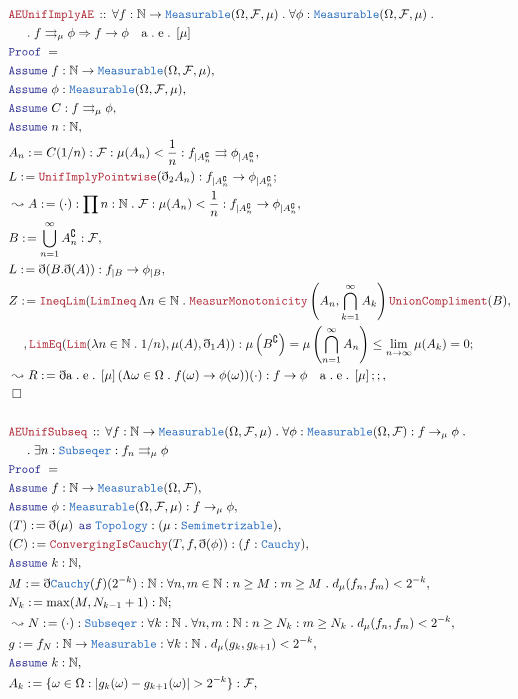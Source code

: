 \documentclass[12pt]{scrartcl}
\newcommand{\TYPE}[1]{\textcolor{NavyBlue}{\mathtt{#1}}}
\newcommand{\LOGIC}[1]{\textcolor{Blue}{\mathtt{#1}}}
\newcommand{\THM}[1]{\textcolor{Maroon}{\mathtt{#1}}}
\renewcommand{\.}{\; . \;}
\newcommand{\de}{: \kern 0.1pc =}
\newcommand{\Act}[1]{\left( #1 \right)}
\newcommand{\Theorem}[2]{& \THM{#1} \, :: \, #2 \\ & \Proof = \\ }
\newcommand{\NewLine}{\\ & \kern 1pc}
\newcommand{\ForEach}[3]{\forall #1 : #2 \. #3 }
\newcommand{\Exist}[2]{\exists #1 : #2}
\newcommand{\DFunc}[3]{\prod #1 : #2 \. #3 }
\newcommand{\Nat}{\mathbb{N} }
\newcommand{\Say}[3]{& #1 \de #2 : #3, \\}
\newcommand{\Conclude}[3]{& #1 \de #2 : #3; \\}
\newcommand{\Derive}[3]{& \leadsto #1 \de #2 : #3, \\}
\newcommand{\A}{\LOGIC{Assume} \;}
\newcommand{\Assume}[2]{& \A #1 : #2, \\}
\newcommand{\As}{\; \LOGIC{as } \;}
\newcommand{\QED}{\; \square}
\newcommand{\EndProof}{& \QED \\}
\newcommand{\ByDef}{\eth}
\newcommand{\Proof}{\LOGIC{Proof} \; }
\newcommand{\UC}{\rightrightarrows}
\renewcommand{\AE}[1]{\mathrm{a\. e\.} \left[#1\right]}
\newcommand{\F}{\mathcal{F}}
\renewcommand{\O}{\Omega}
\begin{document}
\newpage
\begin{align*}
\Theorem{AEUnifImplyAE}{
\ForEach{f}{\Nat \to \TYPE{Measurable}(\O,\F,\mu)}{
\ForEach{\phi}{\TYPE{Measurable}(\O,\F,\mu)}{
 \NewLine \. 
 f \UC_\mu \phi \Rightarrow f \to \phi \quad \AE \mu 
}}}
\Assume{f}{\Nat \to \TYPE{Measurable}(\O,\F,\mu)}
\Assume{\phi}{\TYPE{Measurable}(\O,\F,\mu)}
\Assume{C}{f \UC_\mu \phi}
\Assume{n}{\Nat}
\Say{A_n}{C(1/n)}{\F : \mu(A_n) < \frac{1}{n} : f_{|A_n^\complement} \UC \phi_{|A_n^\complement} }
\Conclude{L}{ \THM{UnifImplyPointwise}(\ByDef_2 A_n)}{f_{|A_n^\complement} \to\phi_{|A_n^\complement}}
\Derive{A}{(\cdot)}{ 
\DFunc{n}{\Nat}{\F : \mu(A_n) < \frac{1}{n} : f_{|A_n^\complement} \to\phi_{|A_n^\complement}}}
\Say{B}{\bigcup_{n=1}^\infty A_n^\complement}{\F}
\Say{L}{\ByDef(B.\ByDef(A))}{f_{|B} \to \phi_{|B}}
\Conclude{Z}{\THM{IneqLim}(\THM{LimIneq} \,  \Lambda n \in \Nat \.\THM{MeasurMonotonicity}\Act{A_n,\bigcap^\infty_{k=1}A_k}\THM{UnionCompliment}(B),
 \NewLine , 
 \THM{LimEq}(\THM{Lim}(\lambda n \in \Nat \. 1/n),\mu(A),\ByDef_1A))}
{\mu \Act{ B^\complement}
 = \mu \Act{\bigcap^\infty_{n=1} A_n } \le \lim_{n \to \infty} \mu(A_k) = 0}
\Derive{R}{\ByDef \AE{\mu}(\Lambda \omega \in \O \. f(\omega) \to \phi(\omega))(\cdot) }
{f \to \phi \quad \AE \mu ;;}
\EndProof
\\
\Theorem{AEUnifSubseq}{
\ForEach{f}{\Nat \to \TYPE{Measurable}(\O,\F,\mu)}{
\ForEach{\phi}{\TYPE{Measurable}(\O,\F) : f \to_\mu \phi}{ 
\NewLine \.
\Exist{n}{\TYPE{Subseqer} : f_n \UC_\mu \phi}
}}}
\Assume{f}{  \Nat \to \TYPE{Measurable}(\O,\F) }
\Assume{\phi}{\TYPE{Measurable}(\O,\F,\mu) : f \to_\mu \phi}
\Say{(T)}{\ByDef(\mu) \, \As \TYPE{Topology}}{(\mu : \TYPE{Semimetrizable})}
\Say{(C)}{\THM{ConvergingIsCauchy}(T,f,\ByDef(\phi))}{(f : \TYPE{Cauchy})} 
\Assume{k}{\Nat}
\Say{M}{\ByDef\TYPE{Cauchy}(f)(2^{-k})}{\Nat : \forall n,m \in \Nat : n \ge M : m \ge M \. d_\mu(f_n,f_m) < 2^{-k}}
\Conclude{N_k}{\max(M,N_{k-1} +1)}{ \Nat}  
\Derive{N}{(\cdot)}{\TYPE{Subseqer} :
\ForEach{k}{\Nat}{
\ForEach{n,m}{\Nat : n \ge N_k : m \ge N_k}{d_\mu(f_n,f_m) < 2^{-k}}
}}
\Say{g}{f_N}{ \Nat \to \TYPE{Measurable} : 
\ForEach{k}{\Nat}{d_\mu(g_k,g_{k+1}) < 2^{-k}}
}
\Assume{k}{\Nat}
\Say{A_k}{\{ \omega \in \O : |g_k(\omega) - g_{k + 1}(\omega)| > 2^{-k} \}}{\F}
 \end{align*}
\newpage
\end{document}
